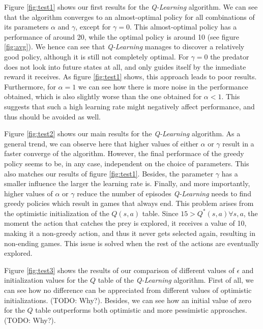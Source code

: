\documentclass[a4paper,10pt]{article}
\begin{document}
Figure \ref{fig:test1} shows our first results for the \textit{Q-Learning} algorithm. We can see that the algorithm converges to an almost-optimal policy for all combinations of its parameters $\alpha$ and $\gamma$, except for $\gamma = 0$. This almost-optimal policy has a performance of around 20, while the optimal policy is around 10 (see figure \ref{fig:avg}). We hence can see that \textit{Q-Learning} manages to discover a relatively good policy, although it is still not completely optimal. For $\gamma = 0$ the predator does not look into future states at all, and only guides itself by the inmediate reward it receives. As figure \ref{fig:test1} shows, this approach leads to poor results. Furthermore, for $\alpha = 1$ we can see how there is more noise in the performance obtained, which is also slightly worse than the one obtained for $\alpha < 1$. This suggests that such a high learning rate might negatively affect performance, and thus should be avoided as well.

Figure \ref{fig:test2} shows our main results for the \textit{Q-Learning} algorithm. As a general trend, we can observe here that higher values of either $\alpha$ or $\gamma$ result in a faster converge of the algorithm. However, the final performace of the greedy policy seems to be, in any case, independent on the choice of parameters. This also matches our results of figure \ref{fig:test1}. Besides, the parameter $\gamma$ has a smaller influence the larger the learning rate is. Finally, and more importantly, higher values of $\alpha$ or $\gamma$ reduce the number of episodes \textit{Q-Learning} needs to find greedy policies which result in games that always end. This problem arises from the optimistic initialization of the $Q(s, a)$ table. Since $15 > Q^*(s, a) \forall s, a$, the moment the action that catches the prey is explored, it receives a value of 10, making it a non-greedy action, and thus it never gets selected again, resulting in non-ending games. This issue is solved when the rest of the actions are eventually explored.

Figure \ref{fig:test3} shows the results of our comparison of different values of $\epsilon$ and initialization values for the $Q$ table of the \textit{Q-Learning} algorithm. First of all, we can see how no difference can be appreciated from different values of optimistic initializations. (TODO: Why?). Besides, we can see how an initial value of zero for the $Q$ table outperforms both optimistic and more pessimistic approaches. (TODO: Why?).
\end{document}
